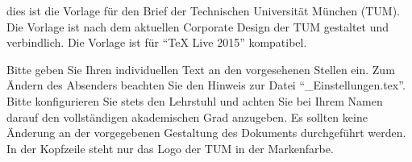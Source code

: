 %
% 
% 
%



\newcommand{\Absender}{%
    \UniversitaetName \\
    \UniversitaetAdresse \\
    2.~Adresszeile erscheint automatisch
}
\newcommand{\EmpfaengerNachname}{Mustermann}
\newcommand{\EmpfaengerAdresse}{%
    Fa. Muster Mechanik\\
    Herrn Max \EmpfaengerNachname\\
    Musterstraße 12\\
    12345 München\\
    ~\\
    Adressfeld mit bis zu 6 Zeilen
}
\newcommand{\Datum}{Datum} %
\newcommand{\Betreff}{Betreffzeile}
\newcommand{\Gruss}{Sehr geehrter Herr \EmpfaengerNachname,}





dies ist die Vorlage für den Brief der Technischen Universität München (TUM).
Die Vorlage ist nach dem aktuellen Corporate Design der TUM gestaltet und
verbindlich. Die Vorlage ist für "`TeX Live 2015"' kompatibel.

Bitte geben Sie Ihren individuellen Text an den vorgesehenen Stellen ein. Zum
Ändern des Absenders beachten Sie den Hinweis zur Datei
"`\_Einstellungen.tex"'. Bitte konfigurieren Sie stets den Lehrstuhl und
achten Sie bei Ihrem Namen darauf den vollständigen akademischen Grad
anzugeben. Es sollten keine Änderung an der vorgegebenen Gestaltung des
Dokuments durchgeführt werden. In der Kopfzeile steht nur das Logo der TUM in
der Markenfarbe.

